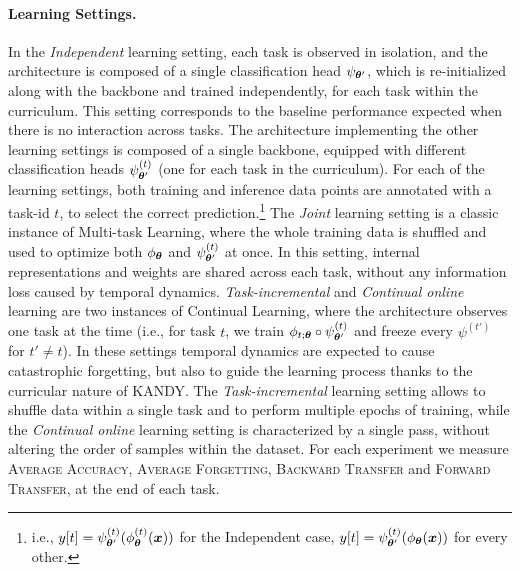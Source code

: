 \paragraph{Learning Settings.} In the \textit{Independent} learning setting, each task is observed in isolation, and the architecture is composed of a single classification head $\psi_{{\bm{\theta}}'}$, which is re-initialized along with the backbone and trained independently, for each task within the curriculum. This setting corresponds to the baseline performance expected when there is no interaction across tasks.
The architecture implementing the other learning settings is composed of a single backbone, equipped with different classification heads $\psi^{(t)}_{{\bm{\theta}}'}$ (one for each task in the curriculum). For each of the learning settings, both training and inference data points are annotated with a task-id $t$, to select the correct prediction.\footnote{i.e., ${y}[t] = \psi^{(t)}_{{\bm{\theta}}'}(\phi^{(t)}_{{\bm{\theta}}}({\bm{x}}))$ for the Independent case, ${y}[t] = \psi^{(t)}_{{\bm{\theta}}'}(\phi_{\bm{\theta}}({\bm{x}}))$ for every other.}
The \textit{Joint} learning setting is a classic instance of Multi-task Learning, where the whole training data is shuffled and used to optimize both $\phi_{\bm{\theta}}$ and $\psi^{(t)}_{{\bm{\theta}}'}$ at once. In this setting, internal representations and weights are shared across each task, without any information loss caused by temporal dynamics.
\textit{Task-incremental} and \textit{Continual online} learning are two instances of Continual Learning, where the architecture observes one task at the time (i.e., for task $t$, we train $\phi_{t;{\bm{\theta}}} \circ \psi^{(t)}_{{\bm{\theta}}'}$ and freeze every $\psi^{(t')}$ for $t' \not = t$). In these settings temporal dynamics are expected to cause catastrophic forgetting, but also to guide the learning process thanks to the curricular nature of \textsc{KANDY}.
The \textit{Task-incremental} learning setting allows to shuffle data within a single task and to perform multiple epochs of training, while the \textit{Continual online} learning setting is characterized by a single pass, without altering the order of samples within the dataset.
For each experiment we measure \textsc{Average Accuracy}, \textsc{Average Forgetting}, \textsc{Backward Transfer} and \textsc{Forward Transfer}, at the end of each task.


